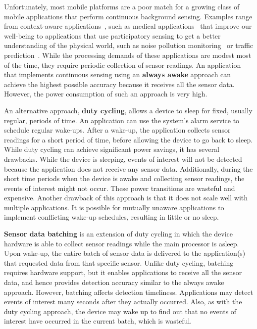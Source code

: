 Unfortunately, most mobile platforms are a poor match for a growing
class of mobile applications that perform continuous background
sensing.  Examples range from context-aware applications~\cite{baldauf2007survey,hong2009context}, such as
medical applications~\cite{hameed2003application,preuveneers2008mobile,tsai2007usability} that improve our
well-being to applications that use participatory sensing to get a
better understanding of the physical world, such as noise pollution
monitoring~\cite{maisonneuve2009citizen,maisonneuve2009noisetube} or 
traffic prediction~\cite{hull2006cartel}.  While the processing demands of
these applications are modest most of the time, they require periodic
collection of sensor readings.  An application that implements continuous 
sensing using an {\bf always awake} approach can achieve the highest possible 
accuracy because it receives all the sensor data.  However, the power
consumption of such an approach is very high.  

An alternative approach, {\bf duty cycling}, allows a device to sleep for fixed, usually
regular, periods of time.  An application can use the system's alarm
service to schedule regular wake-ups.  After a wake-up, the application
collects sensor readings for a short period of time, before
allowing the device to go back to sleep.  While duty cycling can achieve
significant power savings, it has 
several drawbacks.  While the device is sleeping,
events of interest will not be detected because the application does
not receive any sensor data.
Additionally, during the short time periods when the device is awake
and collecting sensor readings, the events of interest might not
occur.  These power transitions are wasteful and expensive.  Another 
drawback of this approach is that it does not scale well with
multiple applications.  It is possible for mutually unaware
applications to implement conflicting wake-up schedules, resulting in
little or no sleep.

{\bf Sensor data batching} is an extension of duty cycling in which
the device hardware is able to collect sensor readings while the main
processor is asleep.  Upon wake-up, the entire batch of sensor data is
delivered to the application(s) that requested data from that
specific sensor.  Unlike duty cycling, batching requires hardware
support, but it enables applications to receive all the sensor data, 
and hence provides detection accuracy similar to the always awake 
approach.  However, batching affects detection 
timeliness.  Applications may detect events of interest many seconds 
after they actually occurred.  Also, as with the duty cycling
approach, the device may wake up to find out that no events of
interest have occurred in the current batch, which is wasteful.

